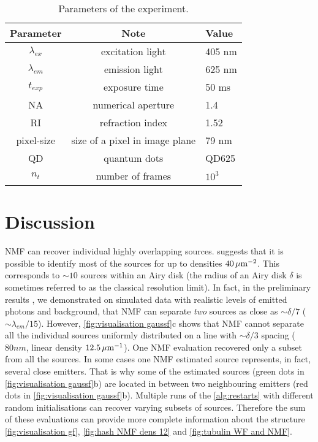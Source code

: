 \begin{table}[!h]	
	\centering
	\begin{tabular}{|c|c|l|}
		\hline 
		\bf Parameter & \bf Note  & \bf Value\tabularnewline
		\hline
		$\lambda_{ex}$ & excitation light & 405 nm\tabularnewline
		$\lambda_{em}$ & emission light & 625 nm\tabularnewline
		$t_{exp}$ & exposure time  & 50 ms\tabularnewline
		NA & numerical aperture & 1.4\tabularnewline
		RI & refraction index & 1.52\tabularnewline
		pixel-size & size of a pixel in image plane & 79 nm\tabularnewline
		QD & quantum dots  & QD625\tabularnewline
		$n_{t}$ & number of frames  & $10^{3}$\tabularnewline
		\hline
	\end{tabular}
	\caption{Parameters of the experiment.}\label{tab:Parameters of the (a) simulations (b) real data}
	\label{tab:parameters experiment}
\end{table}


\clearpage
\section{Discussion\label{sec:Discussion}}

NMF can recover individual highly overlapping sources.  suggests that it is possible to identify most of the sources for up to densities $40\, \mathrm{\mu m}^{-2}$. This corresponds to $\sim 10$ sources within an Airy disk (the radius of an Airy disk $\delta$ is sometimes referred to as the classical resolution limit). In fact, in the preliminary results \cite{Mandula2010b}, we demonstrated on simulated data with realistic levels of emitted photons and background, that NMF can separate \emph{two} sources as close as $\sim \delta/7$ ($\sim \lambda_{em}/15$). However, \autoref{fig:visualisation gaussf}c shows that NMF cannot separate all the individual sources uniformly distributed on a line with $\sim \delta/3$ spacing ($80 \unit{nm}$, linear density $12.5 \, \mathrm{\mu m}^{-1}$). One NMF evaluation recovered only a subset from all the sources. In some cases one NMF estimated source represents, in fact, several close emitters. That is why some of the estimated sources (green dots in \autoref{fig:visualisation gaussf}b) are located in between two neighbouring emitters (red dots in \autoref{fig:visualisation gaussf}b). Multiple runs of the \autoref{alg:restarts} with different random initialisations can recover varying subsets of sources. Therefore the sum of these evaluations can provide more complete information about the structure \autoref{fig:visualisation gf}, \ref{fig:hash NMF dens 12} and \ref{fig:tubulin WF and NMF}. 

